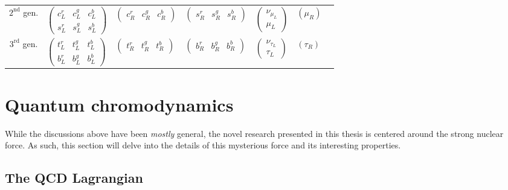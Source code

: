 \begin{table}
{\begin{tabular}{c|llllll}
$2^{\text{nd}}$ gen. & $\left(\begin{array}{lllll}c_L^r & c_L^g & c_L^b \\
s_L^r & s_L^g & s_L^b\end{array}\right)$ & $\left(\begin{array}{llll}c_R^r & c_R^g & c_R^b\end{array}\right)$ & $\left(\begin{array}{llll}s_R^r & s_R^g & s_R^b\end{array}\right)$ & $\left(\begin{array}{c}\nu_{\mu_L} \\
\mu_L\end{array}\right)$ & $\left(\mu_R\right)$ \\
$3^{\text{rd}}$ gen. & $\left(\begin{array}{llll}t_L^r & t_L^g & t_L^b \\
b_L^r & b_L^g & b_L^b\end{array}\right)$ & $\left(\begin{array}{llll}t_R^r & t_R^g & t_R^b\end{array}\right)$ & $\left(\begin{array}{lll}b_R^r & b_R^g & b_R^b\end{array}\right)$ & $\left(\begin{array}{c}\nu_{\tau_L} \\
\tau_L\end{array}\right)$ & $\left(\tau_R\right)$

\end{tabular}}
\label{tab:fermions}
\end{table}


\section{Quantum chromodynamics}
\label{sec:qcd}

While the discussions above have been \textit{mostly} general, the novel research presented in this thesis is centered around the strong nuclear force. As such, this section will delve into the details of this mysterious force and its interesting properties.

\subsection{The QCD Lagrangian}
\label{sec:qcd_lagrangian}

